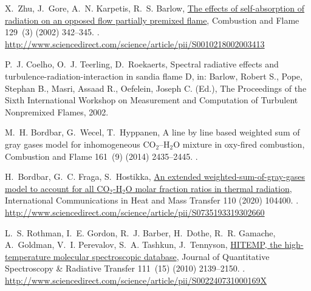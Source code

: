 \documentclass[preprint,12pt]{elsarticle}
\begin{document}
\begin{thebibliography}{10}
X.~Zhu, J.~Gore, A.~N. Karpetis, R.~S. Barlow,
  \href{http://www.sciencedirect.com/science/article/pii/S0010218002003413}{The
  effects of self-absorption of radiation on an opposed flow partially premixed
  flame}, Combustion and Flame 129~(3) (2002) 342--345.
\newblock \href {http://dx.doi.org/10.1016/S0010-2180(02)00341-3}
  {}.
\newline\urlprefix\url{http://www.sciencedirect.com/science/article/pii/S0010218002003413}

P.~J. Coelho, O.~J. Teerling, D.~Roekaerts, Spectral radiative effects and
  turbulence-radiation-interaction in sandia flame {D}, in: {Barlow, Robert S.,
  Pope, Stephan B., Masri, Assaad R., Oefelein, Joseph C.} (Ed.), The
  Proceedings of the Sixth International Workshop on Measurement and
  Computation of Turbulent Nonpremixed Flames, 2002.

M.~H. Bordbar, G.~Wecel, T.~Hyppanen, A line by line based weighted sum of gray
  gases model for inhomogeneous {CO$_2$–H$_2$O} mixture in oxy-fired
  combustion, Combustion and Flame 161~(9) (2014) 2435--2445.
\newblock \href {http://dx.doi.org/10.1016/j.combustflame.2014.03.013}
  {}.

H.~Bordbar, G.~C. Fraga, S.~Hostikka,
  \href{http://www.sciencedirect.com/science/article/pii/S0735193319302660}{An
  extended weighted-sum-of-gray-gases model to account for all {CO$_2$-H$_2$O}
  molar fraction ratios in thermal radiation}, International Communications in
  Heat and Mass Transfer 110 (2020) 104400.
\newblock \href {http://dx.doi.org/10.1016/j.icheatmasstransfer.2019.104400}
  {}.
\newline\urlprefix\url{http://www.sciencedirect.com/science/article/pii/S0735193319302660}

L.~S. Rothman, I.~E. Gordon, R.~J. Barber, H.~Dothe, R.~R. Gamache, A.~Goldman,
  V.~I. Perevalov, S.~A. Tashkun, J.~Tennyson,
  \href{http://www.sciencedirect.com/science/article/pii/S002240731000169X}{{HITEMP},
  the high-temperature molecular spectroscopic database}, Journal of
  Quantitative Spectroscopy {\&} Radiative Transfer 111~(15) (2010) 2139--2150.
\newblock \href {http://dx.doi.org/10.1016/j.jqsrt.2010.05.001}
  {}.
\newline\urlprefix\url{http://www.sciencedirect.com/science/article/pii/S002240731000169X}


\end{thebibliography}
\end{document}

